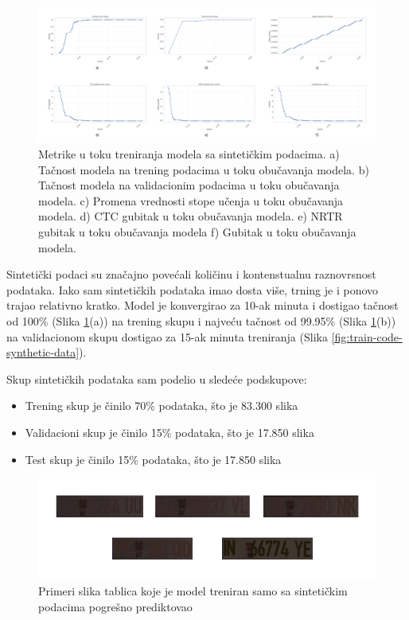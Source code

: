 \documentclass[a4paper,12pt]{article}
\begin{document}
	\begin{figure}[H]
		\centering
		\includegraphics[width=\textwidth]{assets/synthetic-data-metrics.png}
		\caption{Metrike u toku treniranja modela sa sintetičkim podacima. a) Tačnost modela na trening podacima u toku obučavanja modela. b) Tačnost modela na validacionim podacima u toku obučavanja modela. c) Promena vrednosti stope učenja u toku obučavanja modela. d) CTC gubitak u toku obučavanja modela. e) NRTR gubitak u toku obučavanja modela f) Gubitak u toku obučavanja modela.}
		\label{fig:synthetic-data-metrics}
	\end{figure}
	
	Sintetički podaci su značajno povećali količinu i kontenstualnu raznovrsnost podataka. Iako sam sintetičkih podataka imao dosta više, trning je i ponovo trajao relativno kratko. Model je konvergirao za 10-ak minuta i dostigao tačnost od 100\% (Slika \ref{fig:synthetic-data-metrics}(a)) na trening skupu i najveću tačnost od 99.95\% (Slika \ref{fig:synthetic-data-metrics}(b)) na validacionom skupu dostigao za 15-ak minuta treniranja (Slika \ref{fig:train-code-synthetic-data}).\newline
	
	Skup sintetičkih podataka sam podelio u sledeće podskupove:
	\begin{itemize}
		\item Trening skup je činilo 70\% podataka, što je 83.300 slika
		\item Validacioni skup je činilo 15\% podataka, što je 17.850 slika
		\item Test skup je činilo 15\% podataka, što je 17.850 slika
	\end{itemize}
	
	\begin{figure}[H]
		\centering
		\includegraphics[width=\textwidth]{assets/bad-predictions-synthetic-data-model.png}
		\caption{Primeri slika tablica koje je model treniran samo sa sintetičkim podacima pogrešno prediktovao}
		\label{fig:bad-predictions-synthetic-data-model}
	\end{figure}
	
\end{document}
